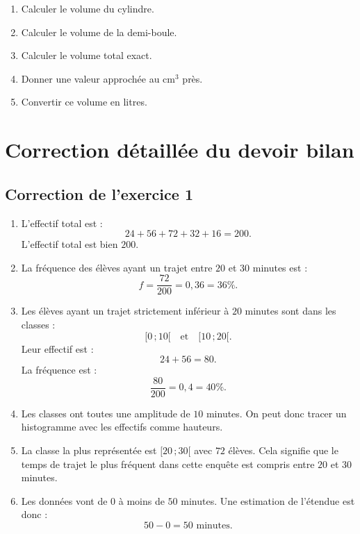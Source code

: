 \documentclass[11pt,a4paper]{article}
\newcommand{\intervalle}[2]{\ensuremath{[#1\,;#2[}}
\begin{document}
\begin{enumerate}
    \item Calculer le volume du cylindre.
    \item Calculer le volume de la demi-boule.
    \item Calculer le volume total exact.
    \item Donner une valeur approchée au cm$^3$ près.
    \item Convertir ce volume en litres.
\end{enumerate}

\newpage

\section{Correction détaillée du devoir bilan}

\subsection*{Correction de l'exercice 1}

\begin{enumerate}
    \item L'effectif total est :
    \[
    24+56+72+32+16=200.
    \]
    L'effectif total est bien $200$.
    
    \item La fréquence des élèves ayant un trajet entre $20$ et $30$ minutes est :
    \[
    f=\frac{72}{200}=0{,}36=36\%.
    \]
    
    \item Les élèves ayant un trajet strictement inférieur à $20$ minutes sont dans les classes :
    \[
    \intervalle{0}{10}\quad \text{et}\quad \intervalle{10}{20}.
    \]
    Leur effectif est :
    \[
    24+56=80.
    \]
    La fréquence est :
    \[
    \frac{80}{200}=0{,}4=40\%.
    \]
    
    \item Les classes ont toutes une amplitude de $10$ minutes. On peut donc tracer un histogramme avec les effectifs comme hauteurs.
    
    \item La classe la plus représentée est $\intervalle{20}{30}$ avec $72$ élèves. Cela signifie que le temps de trajet le plus fréquent dans cette enquête est compris entre $20$ et $30$ minutes.
    
    \item Les données vont de $0$ à moins de $50$ minutes. Une estimation de l'étendue est donc :
    \[
    50-0=50\text{ minutes}.
    \]
\end{enumerate}
\end{document}
